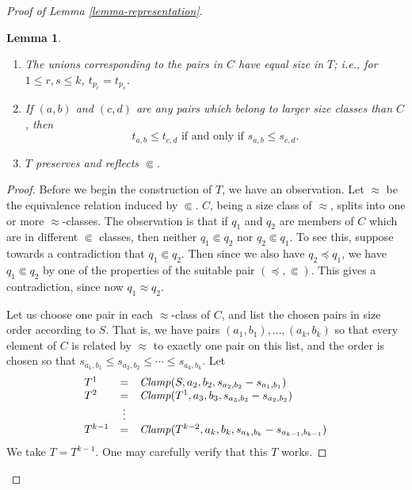 \documentclass[letterpaper]{article} %
\newtheorem{lemma}[theorem]{Lemma}
\theoremstyle{definition}
\newcommand{\Clamp}{\protect{\mbox{\textit{Clamp}}}}
\newcommand{\precsubseteq}{\Subset}
\newcommand{\approxsubset}{\Subset}
\begin{document}
\begin{proof}[Proof of Lemma \ref{lemma-representation}]
\begin{lemma}
\begin{enumerate}
    \item The unions corresponding to the pairs in $C$ have equal size in $T$; i.e., for $1\leq r,s \leq k$, $t_{p_r} = t_{p_s}$.
    
    \item If $(a,b)$ and $(c,d)$ are any pairs 
    which belong to larger size classes than $C$,
    then 
    \[ \mbox{$t_{a,b} \leq t_{c,d} $ if and only if $s_{a,b} \leq s_{c,d} $}.\]
    
    \item $T$ preserves and reflects $\precsubseteq$. 
\label{equalize2}
\end{enumerate}

\label{lemma-equalizing}
\end{lemma}
\begin{proof}
Before we begin the construction of $T$,
we have an observation.
Let $\approx$ be the equivalence relation induced by $\precsubseteq$.
$C$, being a size class of $\approx$, splits into one or more
$\approx$-classes.
The observation is that if $q_1$ and $q_2$ are members of $C$ which are in different $\approxsubset$
classes, then neither $q_1 \precsubseteq q_2$ nor  $q_2 \precsubseteq q_1$.
To see this, suppose towards a contradiction that  $q_1 \precsubseteq q_2$.
Then since we also have $q_2 \preceq q_1$, we have 
$q_1 \precsubseteq q_2$ by one of the properties of the suitable pair $(\preceq, \precsubseteq)$.
This gives a contradiction, since now $q_1 \approx q_2$.


Let us choose one pair in each $\approx$-class of 
$C$, and list the chosen pairs in size order according to $S$.
That is, we have pairs $(a_1, b_1), \ldots, (a_k,b_k)$
so that every element of $C$ is related by 
$\approx$ to exactly one pair on this list,
and the order is chosen so that
$s_{a_1, b_1} \leq s_{a_2, b_2} \leq \cdots\leq s_{a_k, b_k}$.
 Let 
\[ \begin{array}{lcl}
 T^1  & = &  \Clamp(S,a_2,b_2,s_{a_2, b_2} - s_{a_1, b_1})\\
T^2 & = & \Clamp(T^1,a_3, b_3, s_{a_3, b_3} - s_{a_2, b_2} )\\
  & \vdots   & \\
T^{k-1} & = & \Clamp(T^{k-2},a_k,b_k,
s_{a_k, b_k} - s_{a_{k-1}, b_{k-1}})\\
\end{array}
\]
We take $T = T^{k-1}$.  One may carefully verify that this $T$ works.  %
\end{proof}



\end{proof}
\end{document}
